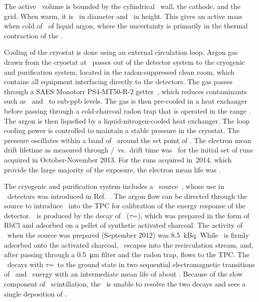 The active \lar\ volume is bounded by the cylindrical \ptfe\ wall, the cathode, and the grid.  When warm, it is \dsfactivevolumediameter\ in diameter and \dsfactivevolumeheight\ in height.  This gives an active mass when cold of \dsfactivemass\ of liquid argon, where the uncertainty is primarily in the thermal contraction of the \ptfe.

Cooling of the cryostat is done using an external circulation loop.  Argon gas drawn from the cryostat at \dsfcryoflowrate\ passes out of the detector system to the cryogenic and purification system, located in the radon-suppressed clean room, which contains all equipment interfacing directly to the detectors.  The gas passes through a SAES Monotorr PS4-MT50-R-2 getter~\cite{saes}, which reduces contaminants such as \ot\ and \nt\ to sub-ppb levels.  The gas is then pre-cooled in a heat exchanger before passing through a cold-charcoal radon trap that is operated in the range \dsfcryorntrapartemp.  The argon is then liquefied by a liquid-nitrogen-cooled heat exchanger.  The loop cooling power is controlled to maintain a stable pressure in the cryostat.  The pressure oscillates within a band of \dsfcryopressurestability\ around the set point of \dsfcryopressure.  The electron mean drift lifetime as measured through \stwo/\sone\ vs.~drift time was \dsfelectronmeanlifefirst\ for the initial set of runs acquired in October-November 2013.  For the runs acquired in~2014, which provide the large majority of the exposure, the electron mean life was \dsfelectronmeanlifesecond.

The cryogenic and purification system includes a \krthree\ source~\cite{venos}, whose use in \lar\  detectors was introduced in Ref.~\cite{lippincott-kr}. 
The argon flow can be directed through the source to introduce \krthree\ into the TPC for calibration of the energy response of the detector.  \krthree\ is produced by the decay of \rbthree\ ($\tau$=\rbthreetau), which was prepared in the form of RbCl and adsorbed on a pellet of synthetic activated charcoal.  
The activity of \rbthree\ when the source was prepared (September 2012) was \SI{8.5}{\kilo\becquerel}.
While \rbthree\ is firmly adsorbed onto the activated charcoal, \krthree\ escapes into the recirculation stream, and, after passing through a \SI{0.5}{\um} filter and the radon trap, flows to the TPC. 
The \krthree\ decays with $\tau$=\krthreetau\ to the ground state in two sequential electromagnetic transitions of \krthreefirstene\ and \krthreesecondene\ energy with an intermediate mean life of about \krthreeinttau.  Because of the slow component of \lar\ scintillation, the \tpc\ is unable to resolve the two decays and sees a single deposition of \krthreepeakene.  

